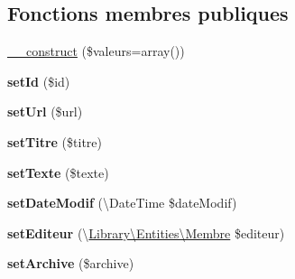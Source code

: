 \subsection*{Fonctions membres publiques}
\begin{DoxyCompactItemize}
\item 
\hyperlink{class_library_1_1_entities_1_1_page_archivable_a6a8dd1d972925f6a5e98fadc554f6710}{\+\_\+\+\_\+construct} (\$valeurs=array())
\item 
\hypertarget{class_library_1_1_entities_1_1_page_archivable_a87313ad678fb2a2a8efb435cf0bdb9a0}{{\bfseries set\+Id} (\$id)}\label{class_library_1_1_entities_1_1_page_archivable_a87313ad678fb2a2a8efb435cf0bdb9a0}

\item 
\hypertarget{class_library_1_1_entities_1_1_page_archivable_a0b6d0c531aa70b1811b166299edab8d0}{{\bfseries set\+Url} (\$url)}\label{class_library_1_1_entities_1_1_page_archivable_a0b6d0c531aa70b1811b166299edab8d0}

\item 
\hypertarget{class_library_1_1_entities_1_1_page_archivable_a1d7b0177b6a719345b3a99ec2b48c5a0}{{\bfseries set\+Titre} (\$titre)}\label{class_library_1_1_entities_1_1_page_archivable_a1d7b0177b6a719345b3a99ec2b48c5a0}

\item 
\hypertarget{class_library_1_1_entities_1_1_page_archivable_a77be937e871225b0ec6f0c35b2547008}{{\bfseries set\+Texte} (\$texte)}\label{class_library_1_1_entities_1_1_page_archivable_a77be937e871225b0ec6f0c35b2547008}

\item 
\hypertarget{class_library_1_1_entities_1_1_page_archivable_a8af2dc090962acf2814e5ae0d3fc0db6}{{\bfseries set\+Date\+Modif} (\textbackslash{}Date\+Time \$date\+Modif)}\label{class_library_1_1_entities_1_1_page_archivable_a8af2dc090962acf2814e5ae0d3fc0db6}

\item 
\hypertarget{class_library_1_1_entities_1_1_page_archivable_a30eb9f2c1631e9c510340c89eb60a1c9}{{\bfseries set\+Editeur} (\textbackslash{}\hyperlink{class_library_1_1_entities_1_1_membre}{Library\textbackslash{}\+Entities\textbackslash{}\+Membre} \$editeur)}\label{class_library_1_1_entities_1_1_page_archivable_a30eb9f2c1631e9c510340c89eb60a1c9}

\item 
\hypertarget{class_library_1_1_entities_1_1_page_archivable_a74c41d5fb2d93a3f2febcb8bcf8d5173}{{\bfseries set\+Archive} (\$archive)}\label{class_library_1_1_entities_1_1_page_archivable_a74c41d5fb2d93a3f2febcb8bcf8d5173}


\end{DoxyCompactItemize}
